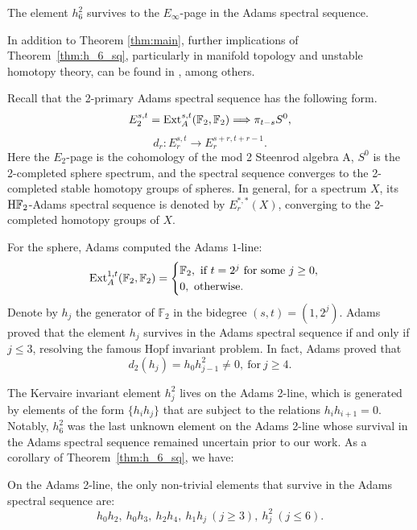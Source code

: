 \documentclass{amsart}
\numberwithin{equation}{section}
\newcommand{\HF}{\mathrm{H}\bF_2}
\begin{document}
\begin{theorem} \label{thm:h_6_sq}\label{thm:h62}
    The element $h_6^2$ survives to the $E_\infty$-page in the Adams spectral sequence.
\end{theorem}

In addition to Theorem \ref{thm:main}, further implications of Theorem~\ref{thm:h_6_sq}, particularly in manifold topology and unstable homotopy theory, can be found in \cite{MillerHHR, MahowaldRemark, HHR, BJMinduction}, among others. 


Recall that the 2-primary Adams spectral sequence has the following form.
$$E_2^{s,t} = \mathrm{Ext}^{s, t}_A(\mathbb{F}_2, \mathbb{F}_2) \Longrightarrow \pi_{t-s} {S^0},$$
$$d_r: E_r^{s,t} \longrightarrow E_r^{s+r, t+r-1}.$$
Here the $E_2$-page is the cohomology of the mod 2 Steenrod algebra A, $S^0$ is the 2-completed sphere spectrum, and the spectral sequence converges to the 2-completed stable homotopy groups of spheres. In general, for a spectrum $X$, its $\HF$-Adams spectral sequence is denoted by $E_r^{*,*}(X)$, converging to the 2-completed homotopy groups of $X$.

For the sphere, Adams \cite{Adams58} computed the Adams $1$-line: 
$$\mathrm{Ext}^{1,t}_A(\mathbb{F}_2, \mathbb{F}_2) = \begin{cases}
 	\mathbb{F}_2, \ \text{if} \ t = 2^j \ \text{for some} \ j \geq 0, \\
 	0, \ \text{otherwise}.
\end{cases}
$$
Denote by $h_j$ the generator of $\mathbb{F}_2$ in the bidegree $(s, t)=(1, 2^j)$. Adams \cite{Adams60} proved that the element $h_j$ survives in the Adams spectral sequence if and only if $j \leq 3$, resolving the famous Hopf invariant problem. In fact, Adams proved that
$$d_2(h_j) = h_0h_{j-1}^2 \neq 0, \ \text{for} \ j \geq 4.$$

The Kervaire invariant element $h_j^2$ lives on the Adams 2-line, which is generated by elements of the form $\{h_ih_j\}$ that are subject to the relations $h_ih_{i+1} = 0$. Notably, $h_6^2$ was the last unknown element on the Adams 2-line whose survival in the Adams spectral sequence remained uncertain prior to our work. As a corollary of Theorem~\ref{thm:h_6_sq}, we have:

\begin{corollary} \label{cor:2line}
    On the Adams 2-line, the only non-trivial elements that survive in the Adams spectral sequence are:
    $$h_0h_2, \ h_0h_3, \ h_2h_4, \ h_1h_j \ (j \geq 3), \ h_j^2 \ (j \leq 6).$$
\end{corollary}
\end{document}
